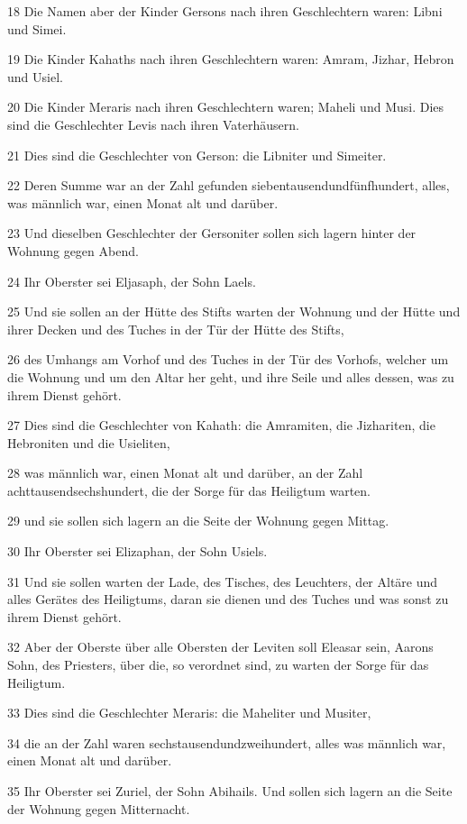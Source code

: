 \par 18 Die Namen aber der Kinder Gersons nach ihren Geschlechtern waren: Libni und Simei.
\par 19 Die Kinder Kahaths nach ihren Geschlechtern waren: Amram, Jizhar, Hebron und Usiel.
\par 20 Die Kinder Meraris nach ihren Geschlechtern waren; Maheli und Musi. Dies sind die Geschlechter Levis nach ihren Vaterhäusern.
\par 21 Dies sind die Geschlechter von Gerson: die Libniter und Simeiter.
\par 22 Deren Summe war an der Zahl gefunden siebentausendundfünfhundert, alles, was männlich war, einen Monat alt und darüber.
\par 23 Und dieselben Geschlechter der Gersoniter sollen sich lagern hinter der Wohnung gegen Abend.
\par 24 Ihr Oberster sei Eljasaph, der Sohn Laels.
\par 25 Und sie sollen an der Hütte des Stifts warten der Wohnung und der Hütte und ihrer Decken und des Tuches in der Tür der Hütte des Stifts,
\par 26 des Umhangs am Vorhof und des Tuches in der Tür des Vorhofs, welcher um die Wohnung und um den Altar her geht, und ihre Seile und alles dessen, was zu ihrem Dienst gehört.
\par 27 Dies sind die Geschlechter von Kahath: die Amramiten, die Jizhariten, die Hebroniten und die Usieliten,
\par 28 was männlich war, einen Monat alt und darüber, an der Zahl achttausendsechshundert, die der Sorge für das Heiligtum warten.
\par 29 und sie sollen sich lagern an die Seite der Wohnung gegen Mittag.
\par 30 Ihr Oberster sei Elizaphan, der Sohn Usiels.
\par 31 Und sie sollen warten der Lade, des Tisches, des Leuchters, der Altäre und alles Gerätes des Heiligtums, daran sie dienen und des Tuches und was sonst zu ihrem Dienst gehört.
\par 32 Aber der Oberste über alle Obersten der Leviten soll Eleasar sein, Aarons Sohn, des Priesters, über die, so verordnet sind, zu warten der Sorge für das Heiligtum.
\par 33 Dies sind die Geschlechter Meraris: die Maheliter und Musiter,
\par 34 die an der Zahl waren sechstausendundzweihundert, alles was männlich war, einen Monat alt und darüber.
\par 35 Ihr Oberster sei Zuriel, der Sohn Abihails. Und sollen sich lagern an die Seite der Wohnung gegen Mitternacht.
